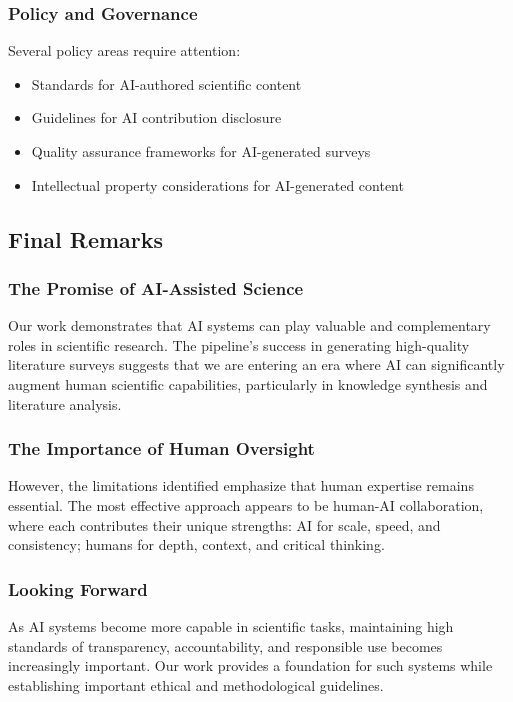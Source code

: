 \subsubsection{Policy and Governance}

Several policy areas require attention:
\begin{itemize}
    \item Standards for AI-authored scientific content
    \item Guidelines for AI contribution disclosure
    \item Quality assurance frameworks for AI-generated surveys
    \item Intellectual property considerations for AI-generated content
\end{itemize}

\subsection{Final Remarks}

\subsubsection{The Promise of AI-Assisted Science}

Our work demonstrates that AI systems can play valuable and complementary roles in scientific research. The pipeline's success in generating high-quality literature surveys suggests that we are entering an era where AI can significantly augment human scientific capabilities, particularly in knowledge synthesis and literature analysis.

\subsubsection{The Importance of Human Oversight}

However, the limitations identified emphasize that human expertise remains essential. The most effective approach appears to be human-AI collaboration, where each contributes their unique strengths: AI for scale, speed, and consistency; humans for depth, context, and critical thinking.

\subsubsection{Looking Forward}

As AI systems become more capable in scientific tasks, maintaining high standards of transparency, accountability, and responsible use becomes increasingly important. Our work provides a foundation for such systems while establishing important ethical and methodological guidelines.

